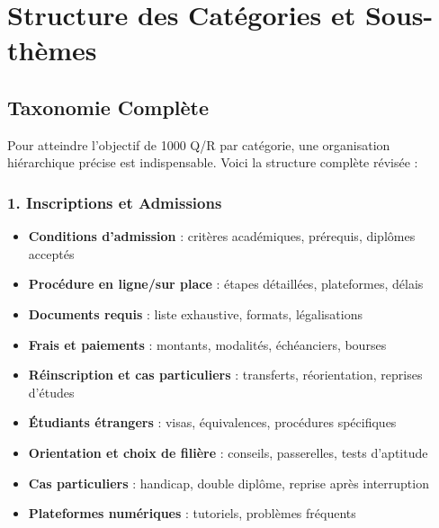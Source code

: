 \documentclass[11pt,a4paper]{article}
\begin{document}
\section{Structure des Catégories et Sous-thèmes}
\label{sec:categories}

\subsection{Taxonomie Complète}
Pour atteindre l'objectif de 1000 Q/R par catégorie, une organisation hiérarchique précise est indispensable. Voici la structure complète révisée :

\subsubsection{1. Inscriptions et Admissions}
\begin{itemize}
    \item \textbf{Conditions d'admission} : critères académiques, prérequis, diplômes acceptés
    \item \textbf{Procédure en ligne/sur place} : étapes détaillées, plateformes, délais
    \item \textbf{Documents requis} : liste exhaustive, formats, légalisations
    \item \textbf{Frais et paiements} : montants, modalités, échéanciers, bourses
    \item \textbf{Réinscription et cas particuliers} : transferts, réorientation, reprises d'études
    \item \textbf{Étudiants étrangers} : visas, équivalences, procédures spécifiques
    \item \textbf{Orientation et choix de filière} : conseils, passerelles, tests d'aptitude
    \item \textbf{Cas particuliers} : handicap, double diplôme, reprise après interruption
    \item \textbf{Plateformes numériques} : tutoriels, problèmes fréquents
\end{itemize}
\end{document}
